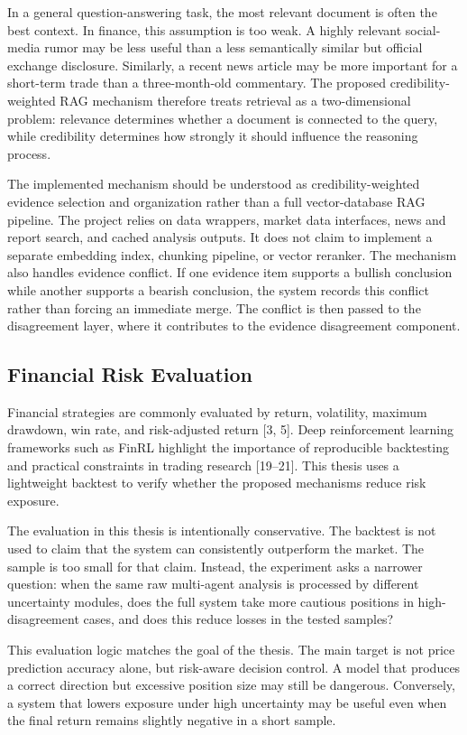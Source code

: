 \documentclass[14pt,a4paper]{extarticle}
\begin{document}
In a general question-answering task, the most relevant document is often the best context. In finance, this assumption is too weak. A highly relevant social-media rumor may be less useful than a less semantically similar but official exchange disclosure. Similarly, a recent news article may be more important for a short-term trade than a three-month-old commentary. The proposed credibility-weighted RAG mechanism therefore treats retrieval as a two-dimensional problem: relevance determines whether a document is connected to the query, while credibility determines how strongly it should influence the reasoning process.

The implemented mechanism should be understood as credibility-weighted evidence selection and organization rather than a full vector-database RAG pipeline. The project relies on data wrappers, market data interfaces, news and report search, and cached analysis outputs. It does not claim to implement a separate embedding index, chunking pipeline, or vector reranker. The mechanism also handles evidence conflict. If one evidence item supports a bullish conclusion while another supports a bearish conclusion, the system records this conflict rather than forcing an immediate merge. The conflict is then passed to the disagreement layer, where it contributes to the evidence disagreement component.

\subsection{Financial Risk Evaluation}

Financial strategies are commonly evaluated by return, volatility, maximum drawdown, win rate, and risk-adjusted return [3, 5]. Deep reinforcement learning frameworks such as FinRL highlight the importance of reproducible backtesting and practical constraints in trading research [19--21]. This thesis uses a lightweight backtest to verify whether the proposed mechanisms reduce risk exposure.

The evaluation in this thesis is intentionally conservative. The backtest is not used to claim that the system can consistently outperform the market. The sample is too small for that claim. Instead, the experiment asks a narrower question: when the same raw multi-agent analysis is processed by different uncertainty modules, does the full system take more cautious positions in high-disagreement cases, and does this reduce losses in the tested samples?

This evaluation logic matches the goal of the thesis. The main target is not price prediction accuracy alone, but risk-aware decision control. A model that produces a correct direction but excessive position size may still be dangerous. Conversely, a system that lowers exposure under high uncertainty may be useful even when the final return remains slightly negative in a short sample.
\end{document}
